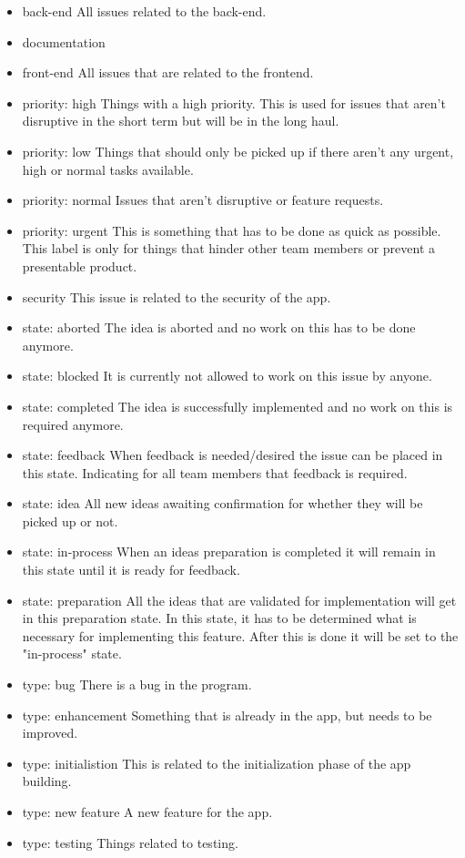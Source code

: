 \documentclass[sigconf,nonacm]{acmart}
\begin{document}
\begin{itemize}
    \item back-end              All issues related to the back-end.
    \item documentation
    \item front-end             All issues that are related to the frontend.
    \item priority: high        Things with a high priority. This is used for issues that aren't disruptive in the short term but will be in the long haul.
    \item priority: low         Things that should only be picked up if there aren't any urgent, high or normal tasks available.
    \item priority: normal      Issues that aren't disruptive or feature requests.
    \item priority: urgent      This is something that has to be done as quick as possible. This label is only for things that hinder other team members or prevent a presentable product.
    \item security              This issue is related to the security of the app.
    \item state: aborted        The idea is aborted and no work on this has to be done anymore.
    \item state: blocked        It is currently not allowed to work on this issue by anyone.
    \item state: completed      The idea is successfully implemented and no work on this is required anymore.
    \item state: feedback       When feedback is needed/desired the issue can be placed in this state. Indicating for all team members that feedback is required.
    \item state: idea           All new ideas awaiting confirmation for whether they will be picked up or not.
    \item state: in-process     When an ideas preparation is completed it will remain in this state until it is ready for feedback.
    \item state: preparation    All the ideas that are validated for implementation will get in this preparation state. In this state, it has to be determined what is necessary for implementing this feature. After this is done it will be set to the "in-process" state.
    \item type: bug             There is a bug in the program.          
    \item type: enhancement     Something that is already in the app, but needs to be improved.
    \item type: initialistion   This is related to the initialization phase of the app building.
    \item type: new feature     A new feature for the app.
    \item type: testing         Things related to testing.
\end{itemize}
\end{document}
